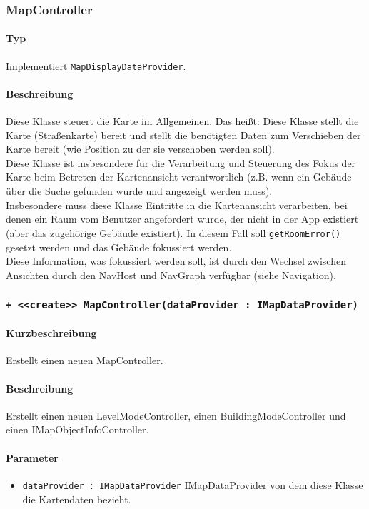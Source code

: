 \subsubsection{MapController}
\paragraph*{Typ}
Implementiert \texttt{MapDisplayDataProvider}.
\paragraph*{Beschreibung}
Diese Klasse steuert die Karte im Allgemeinen. Das heißt: Diese Klasse stellt die Karte (Straßenkarte) bereit 
und stellt die benötigten Daten zum Verschieben der Karte bereit (wie Position zu der sie verschoben werden soll).\\
Diese Klasse ist insbesondere für die Verarbeitung und Steuerung des Fokus der Karte beim Betreten der 
Kartenansicht verantwortlich (z.B. wenn ein Gebäude über die Suche gefunden wurde und angezeigt werden muss).\\
Insbesondere muss diese Klasse Eintritte in die Kartenansicht verarbeiten, bei denen ein Raum vom Benutzer angefordert wurde, 
der nicht in der App existiert (aber das zugehörige Gebäude existiert). In diesem Fall soll \texttt{getRoomError()} gesetzt 
werden und das Gebäude fokussiert werden.\\
Diese Information, was fokussiert werden soll, ist durch den Wechsel zwischen Ansichten durch den NavHost und NavGraph verfügbar (siehe Navigation).

\subsubsection*{\texttt{+ <<create>> MapController(dataProvider : IMapDataProvider)}}%
\paragraph*{Kurzbeschreibung}
Erstellt einen neuen MapController.
\paragraph*{Beschreibung}
Erstellt einen neuen LevelModeController, einen BuildingModeController und einen IMapObjectInfoController.
\paragraph*{Parameter}
\begin{itemize}
    \item \texttt{dataProvider : IMapDataProvider} IMapDataProvider von dem diese Klasse die Kartendaten bezieht.
\end{itemize}

